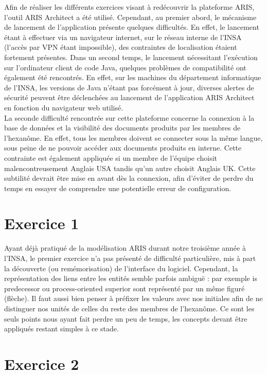 
Afin de réaliser les différents exercices visant à redécouvrir la plateforme ARIS, l'outil ARIS Architect a été utilisé. Cependant, au premier abord, le mécanisme de lancement de l'application présente quelques difficultés. En effet, le lancement étant à effectuer via un navigateur internet, sur le réseau interne de l'INSA (l'accès par VPN étant impossible), des contraintes de localisation étaient fortement présentes. Dans un second temps, le lancement nécessitant l'exécution sur l'ordinateur client de code Java, quelques problèmes de compatibilité ont également été rencontrés. En effet, sur les machines du département informatique de l'INSA, les versions de Java n'étant pas forcément à jour, diverses alertes de sécurité peuvent être déclenchées au lancement de l'application ARIS Architect en fonction du navigateur web utilisé. \\

La seconde difficulté rencontrée sur cette plateforme concerne la connexion à la base de données et la visibilité des documents produits par les membres de l'hexanôme. En effet, tous les membres doivent se connecter sous la même langue, sous peine de ne pouvoir accéder aux documents produits en interne. Cette contrainte est également appliquée si un membre de l'équipe choisit malencontreusement \og{}Anglais USA\tg{} tandis qu'un autre choisit \og{}Anglais UK\tg{}. Cette subtilité devrait être mise en avant dès la connexion, afin d'éviter de perdre du temps en essayer de comprendre une potentielle erreur de configuration.

\section{Exercice 1}

Ayant déjà pratiqué de la modélisation ARIS durant notre troisième année à l'INSA, le premier exercice n'a pas présenté de difficulté particulière, mis à part la découverte (ou remémorisation) de l'interface du logiciel. Cependant, la représentation des liens entre les entités semble parfois ambiguë : par exemple \og{}is predecessor\tg{} ou \og{}process-oriented superior\tg{} sont représenté par un même figuré (flèche). Il faut aussi bien penser à préfixer les valeurs avec nos initiales afin de ne distinguer nos unités de celles du reste des membres de l'hexanôme. Ce sont les seuls points nous ayant fait perdre un peu de temps, les concepts devant être appliqués restant simples à ce stade.

\section{Exercice 2}

